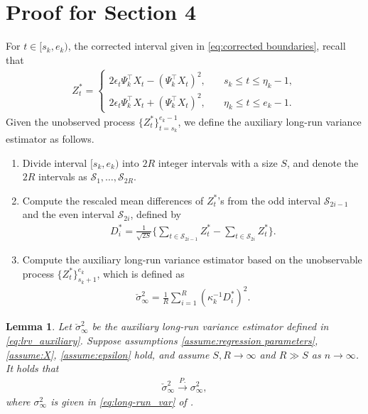 \documentclass[11pt]{article}
\theoremstyle{plain}
\newtheorem{lemma}[theorem]{Lemma}
\theoremstyle{definition}
\begin{document}
\section{Proof for Section 4}\label{sec-app-lrv}
For $t \in [s_k, e_k)$, the corrected interval given in \eqref{eq:corrected boundaries}, recall that
\begin{align*}
    Z_t^*
    = \begin{cases}
        2\epsilon_t\Psi_k^{\top}X_t - (\Psi_k^{\top}X_t)^2, \quad& s_k \leq t \leq \eta_k-1,\\
        2\epsilon_t\Psi_k^{\top}X_t + (\Psi_k^{\top}X_t)^2, \quad& \eta_k \leq t \leq e_k-1.
    \end{cases}
\end{align*}
Given the unobserved process $\{Z_t^*\}_{t = s_k}^{e_k-1}$, we define the auxiliary long-run variance estimator as follows.
\begin{enumerate}
    \item[\textbf{Step 1.}] Divide interval $[s_k, e_k)$ into $2R$ integer intervals with a size $S$, and denote the $2R$ intervals as $\mathcal{S}_1, \dots, \mathcal{S}_{2R}$.
    \item[\textbf{Step 2.}] Compute the rescaled mean differences of $Z_t^*$'s from the odd interval $\mathcal{S}_{2i-1}$ and the even interval $\mathcal{S}_{2i}$, defined by
\begin{align*}
    D_i^* = \frac{1}{\sqrt{2S}}\bigg\{\sum_{t \in \mathcal{S}_{2i-1}}Z_t^* - \sum_{t \in \mathcal{S}_{2i}}Z_t^*\bigg\}.
\end{align*}
    \item[\textbf{Step 3.}] Compute the auxiliary long-run variance estimator based on the unobservable process $\{Z_t^*\}_{s_k+1}^{e_k}$, which is defined as
 \begin{align}\label{eq:lrv_auxiliary}
    \check{\sigma}_{\infty}^2 = \frac{1}{R}\sum_{i = 1}^R(\kappa_k^{-1}D_i^*)^2.
 \end{align}
\end{enumerate}


\begin{lemma}\label{lemma:auxiliary_lrv_consist}
    Let $\check{\sigma}_{\infty}^2$ be the auxiliary long-run variance estimator defined in \eqref{eq:lrv_auxiliary}. Suppose assumptions \ref{assume:regression parameters}, \ref{assume:X}, \ref{assume:epsilon} hold, and assume $S, R \to \infty$ and $R \gg S$ as $n \to \infty$. It holds that
\begin{align*}
    \check{\sigma}_{\infty}^2 \overset{P.}{\to} \sigma_{\infty}^2,
\end{align*}
where $\sigma_{\infty}^2$ is given in \eqref{eq:long-run_var} of .
\end{lemma}
\end{document}
